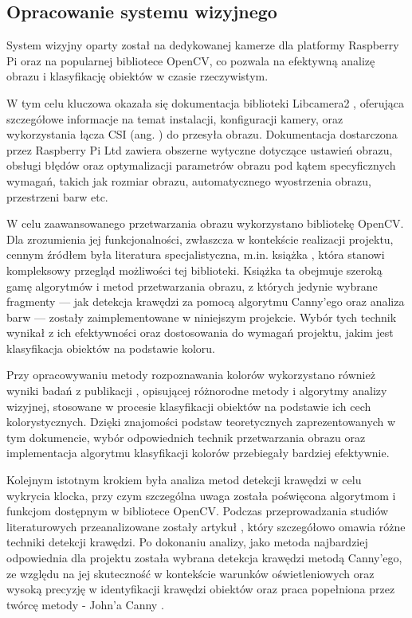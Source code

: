 \subsection{Opracowanie systemu wizyjnego}
\label{sec:opracowania-wizja}

System wizyjny oparty został na dedykowanej kamerze dla platformy Raspberry Pi oraz na popularnej bibliotece OpenCV, co pozwala na efektywną analizę obrazu i klasyfikację obiektów w czasie rzeczywistym. 

W tym celu kluczowa okazała się dokumentacja biblioteki Libcamera2 \cite{bib:manualLibcamera2}, oferująca szczegółowe informacje na temat instalacji, konfiguracji kamery, oraz wykorzystania łącza CSI (ang. ) do przesyła obrazu. Dokumentacja dostarczona przez Raspberry Pi Ltd zawiera obszerne wytyczne dotyczące ustawień obrazu, obsługi błędów oraz optymalizacji parametrów obrazu pod kątem specyficznych wymagań, takich jak rozmiar obrazu, automatycznego wyostrzenia obrazu, przestrzeni barw etc.

W celu zaawansowanego przetwarzania obrazu wykorzystano bibliotekę OpenCV. Dla zrozumienia jej funkcjonalności, zwłaszcza w kontekście realizacji projektu, cennym źródłem była literatura specjalistyczna, m.in. książka \cite{bib:ksiazka}, która stanowi kompleksowy przegląd możliwości tej biblioteki. Książka ta obejmuje szeroką gamę algorytmów i metod przetwarzania obrazu, z których jedynie wybrane fragmenty — jak detekcja krawędzi za pomocą algorytmu Canny’ego oraz analiza barw — zostały zaimplementowane w niniejszym projekcie. Wybór tych technik wynikał z ich efektywności oraz dostosowania do wymagań projektu, jakim jest klasyfikacja obiektów na podstawie koloru.

Przy opracowywaniu metody rozpoznawania kolorów wykorzystano również wyniki badań z publikacji \cite{bib:artykul2}, opisującej różnorodne metody i algorytmy analizy wizyjnej, stosowane w procesie klasyfikacji obiektów na podstawie ich cech kolorystycznych. Dzięki znajomości podstaw teoretycznych zaprezentowanych w tym dokumencie, wybór odpowiednich technik przetwarzania obrazu oraz implementacja algorytmu klasyfikacji kolorów przebiegały bardziej efektywnie.

Kolejnym istotnym krokiem była analiza metod detekcji krawędzi w celu wykrycia klocka, przy czym szczególna uwaga została poświęcona algorytmom i funkcjom dostępnym w bibliotece OpenCV. Podczas przeprowadzania studiów literaturowych przeanalizowane zostały artykuł \cite{bib:artykul}, który szczegółowo omawia różne techniki detekcji krawędzi. Po dokonaniu analizy, jako metoda najbardziej odpowiednia dla projektu została wybrana detekcja krawędzi metodą Canny’ego, ze względu na jej skuteczność w kontekście warunków oświetleniowych oraz wysoką precyzję w identyfikacji krawędzi obiektów oraz praca popełniona przez twórcę metody - John'a Canny \cite{bib:canny-article}.


